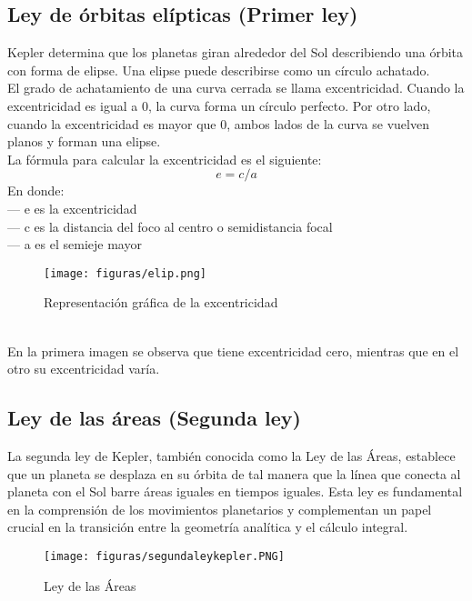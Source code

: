 \documentclass[journal]{IEEEtran}
\begin{document}
\subsection{Ley de órbitas elípticas (Primer ley)}
Kepler determina que los planetas giran alrededor del Sol describiendo una órbita con forma de elipse. Una elipse puede describirse como un círculo achatado.\\
El grado de achatamiento de una curva cerrada se llama excentricidad. Cuando la excentricidad es igual a 0, la curva forma un círculo perfecto. Por otro lado, cuando la excentricidad es mayor que 0, ambos lados de la curva se vuelven planos y forman una elipse.\cite{SignificadosKepler}\\
La fórmula para calcular la excentricidad es el siguiente:
\begin{equation}
    e = c/a
\end{equation}
En donde:\\
— e es la excentricidad\\
— c es la distancia del foco al centro o semidistancia focal\\
— a es el semieje mayor\\
\begin{figure} [h]
    \centering
    \texttt{[image: figuras/elip.png]}
    \caption{Representación gráfica de la excentricidad}
    \label{fig:msf}
\end{figure}\\
En la primera imagen se observa que tiene excentricidad cero, mientras que en el otro su excentricidad varía.

\subsection{Ley de las áreas (Segunda ley)}

La segunda ley de Kepler, también conocida como la Ley de las Áreas, establece que un planeta se desplaza en su órbita de tal manera que la línea que conecta al planeta con el Sol barre áreas iguales en tiempos iguales. Esta ley es fundamental en la comprensión de los movimientos planetarios y complementan un papel crucial en la transición entre la geometría analítica y el cálculo integral.

\begin{figure} [h]
    \centering
    \texttt{[image: figuras/segundaleykepler.PNG]}
    \caption{Ley de las Áreas}
    \label{fig:msf}
\end{figure}
\end{document}
